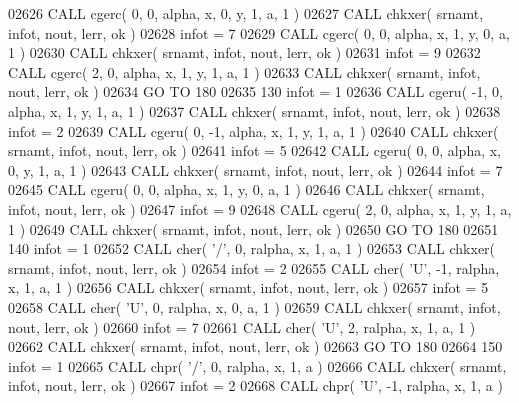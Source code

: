 \begin{DoxyCode}
02626       \textcolor{keyword}{CALL }cgerc( 0, 0, alpha, x, 0, y, 1, a, 1 )
02627       \textcolor{keyword}{CALL }chkxer( srnamt, infot, nout, lerr, ok )
02628       infot = 7
02629       \textcolor{keyword}{CALL }cgerc( 0, 0, alpha, x, 1, y, 0, a, 1 )
02630       \textcolor{keyword}{CALL }chkxer( srnamt, infot, nout, lerr, ok )
02631       infot = 9
02632       \textcolor{keyword}{CALL }cgerc( 2, 0, alpha, x, 1, y, 1, a, 1 )
02633       \textcolor{keyword}{CALL }chkxer( srnamt, infot, nout, lerr, ok )
02634       \textcolor{keywordflow}{GO TO} 180
02635   130 infot = 1
02636       \textcolor{keyword}{CALL }cgeru( -1, 0, alpha, x, 1, y, 1, a, 1 )
02637       \textcolor{keyword}{CALL }chkxer( srnamt, infot, nout, lerr, ok )
02638       infot = 2
02639       \textcolor{keyword}{CALL }cgeru( 0, -1, alpha, x, 1, y, 1, a, 1 )
02640       \textcolor{keyword}{CALL }chkxer( srnamt, infot, nout, lerr, ok )
02641       infot = 5
02642       \textcolor{keyword}{CALL }cgeru( 0, 0, alpha, x, 0, y, 1, a, 1 )
02643       \textcolor{keyword}{CALL }chkxer( srnamt, infot, nout, lerr, ok )
02644       infot = 7
02645       \textcolor{keyword}{CALL }cgeru( 0, 0, alpha, x, 1, y, 0, a, 1 )
02646       \textcolor{keyword}{CALL }chkxer( srnamt, infot, nout, lerr, ok )
02647       infot = 9
02648       \textcolor{keyword}{CALL }cgeru( 2, 0, alpha, x, 1, y, 1, a, 1 )
02649       \textcolor{keyword}{CALL }chkxer( srnamt, infot, nout, lerr, ok )
02650       \textcolor{keywordflow}{GO TO} 180
02651   140 infot = 1
02652       \textcolor{keyword}{CALL }cher( \textcolor{stringliteral}{'/'}, 0, ralpha, x, 1, a, 1 )
02653       \textcolor{keyword}{CALL }chkxer( srnamt, infot, nout, lerr, ok )
02654       infot = 2
02655       \textcolor{keyword}{CALL }cher( \textcolor{stringliteral}{'U'}, -1, ralpha, x, 1, a, 1 )
02656       \textcolor{keyword}{CALL }chkxer( srnamt, infot, nout, lerr, ok )
02657       infot = 5
02658       \textcolor{keyword}{CALL }cher( \textcolor{stringliteral}{'U'}, 0, ralpha, x, 0, a, 1 )
02659       \textcolor{keyword}{CALL }chkxer( srnamt, infot, nout, lerr, ok )
02660       infot = 7
02661       \textcolor{keyword}{CALL }cher( \textcolor{stringliteral}{'U'}, 2, ralpha, x, 1, a, 1 )
02662       \textcolor{keyword}{CALL }chkxer( srnamt, infot, nout, lerr, ok )
02663       \textcolor{keywordflow}{GO TO} 180
02664   150 infot = 1
02665       \textcolor{keyword}{CALL }chpr( \textcolor{stringliteral}{'/'}, 0, ralpha, x, 1, a )
02666       \textcolor{keyword}{CALL }chkxer( srnamt, infot, nout, lerr, ok )
02667       infot = 2
02668       \textcolor{keyword}{CALL }chpr( \textcolor{stringliteral}{'U'}, -1, ralpha, x, 1, a )

\end{DoxyCode}
